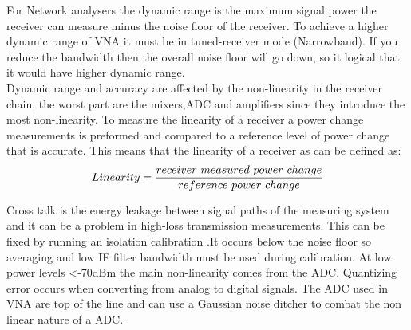 For Network analysers the dynamic range is the maximum signal power the receiver can measure minus the noise floor of the receiver. To achieve a higher dynamic range of \gls{VNA} it must be  in tuned-receiver mode (Narrowband).
If you reduce the bandwidth then the overall noise floor will go down, so it logical that it would have higher dynamic range. \citep{AgilentNVA} \\

Dynamic range and accuracy are affected by the non-linearity in the receiver chain, the worst part are the mixers,\gls{ADC} and amplifiers since they introduce the most non-linearity. To measure the linearity of a receiver a power change measurements is preformed and compared to a reference level of power change that is accurate. This means that the linearity of a receiver as can be defined as:
\begin{equation}
Linearity = \frac{receiver \\\ measured \\\ power \\\ change}{reference \ power \ change}
\label{Linearity}
\end{equation}
 

Cross talk is the energy leakage between signal paths of the measuring system and it can be a problem in high-loss transmission measurements. This can be fixed by running an isolation calibration \citep{crosstalk}.It occurs below the noise floor so averaging and low \gls{IF} filter bandwidth must be used during calibration.
At low power levels <-70dBm the main non-linearity comes from the \gls{ADC}. Quantizing error occurs when converting from analog to digital signals. The \gls{ADC} used in \gls{VNA} are top of the line and can use a Gaussian noise ditcher to combat the non linear nature of a \gls{ADC}. 


